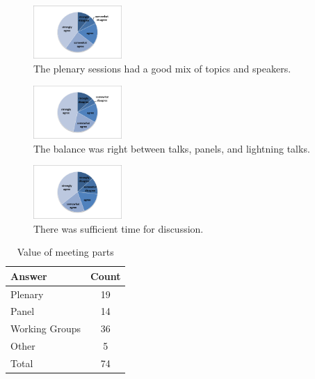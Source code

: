 \begin{figure}[h!]
\includegraphics[width=0.3\textwidth]{figures/SurveyFig1}
\caption{The plenary sessions had a good mix of topics and speakers.
\label{fig:SFig1}}
\end{figure}
\begin{figure}[h!]
\includegraphics[width=0.3\textwidth]{figures/SurveyFig2}
\caption{The balance was right between talks, panels, and lightning talks.
\label{fig:SFig2}}
\end{figure}
\begin{figure}[h!]
\includegraphics[width=0.3\textwidth]{figures/SurveyFig3}
\caption{There was sufficient time for discussion.
\label{fig:SFig3}}
\end{figure}




\begin{table}[h!]
\centering
\caption{Value of meeting parts}
\label{tab:survey_parts}
\begin{tabular}{|l|c|}
\hline
{\bf Answer} &
{\bf Count} \\ \hline
Plenary &
19 \\
Panel &
14 \\
Working Groups &
36 \\
Other &
5 \\
Total &
74 \\
\hline
\end{tabular}
\end{table}

